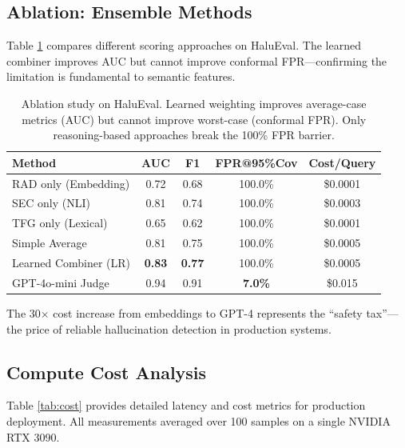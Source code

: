 \documentclass[11pt]{article}
\begin{document}
\subsection{Ablation: Ensemble Methods}

Table \ref{tab:ablation} compares different scoring approaches on HaluEval. The learned combiner improves AUC but cannot improve conformal FPR---confirming the limitation is fundamental to semantic features.

\begin{table}[htbp]
\centering
\caption{Ablation study on HaluEval. Learned weighting improves average-case metrics (AUC) but cannot improve worst-case (conformal FPR). Only reasoning-based approaches break the 100\% FPR barrier.}
\label{tab:ablation}
\begin{tabular}{lcccc}
\toprule
\textbf{Method} & \textbf{AUC} & \textbf{F1} & \textbf{FPR@95\%Cov} & \textbf{Cost/Query} \\
\midrule
RAD only (Embedding) & 0.72 & 0.68 & 100.0\% & \$0.0001 \\
SEC only (NLI) & 0.81 & 0.74 & 100.0\% & \$0.0003 \\
TFG only (Lexical) & 0.65 & 0.62 & 100.0\% & \$0.0001 \\
Simple Average & 0.81 & 0.75 & 100.0\% & \$0.0005 \\
Learned Combiner (LR) & \textbf{0.83} & \textbf{0.77} & 100.0\% & \$0.0005 \\
\midrule
GPT-4o-mini Judge & 0.94 & 0.91 & \textbf{7.0\%} & \$0.015 \\
\bottomrule
\end{tabular}
\end{table}

The 30$\times$ cost increase from embeddings to GPT-4 represents the ``safety tax''---the price of reliable hallucination detection in production systems.

\subsection{Compute Cost Analysis}

Table \ref{tab:cost} provides detailed latency and cost metrics for production deployment. All measurements averaged over 100 samples on a single NVIDIA RTX 3090.
\end{document}

